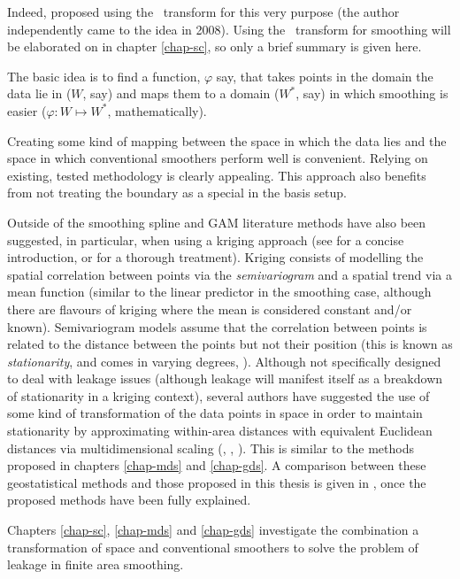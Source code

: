 \begin{enumerate}
Indeed,  proposed using the \sch\ transform for this very purpose (the author independently came to the idea in 2008). Using the \sch\ transform for smoothing will be elaborated on in chapter \ref{chap-sc}, so only a brief summary is given here.

The basic idea is to find a function, $\varphi$ say, that takes points in the domain the data lie in ($W$, say) and maps them to a domain ($W^*$, say) in which smoothing is easier ($\varphi : W \mapsto W^*$, mathematically).

Creating some kind of mapping between the space in which the data lies and the space in which conventional smoothers perform well is convenient. Relying on existing, tested methodology is clearly appealing. This approach also benefits from not treating the boundary as a special in the basis setup.
\end{enumerate}

Outside of the smoothing spline and GAM literature methods have also been suggested, in particular, when using a kriging approach (see \cite[pp. 425-430]{MASS} for a concise introduction, \cite{schabenberger} or \cite{diggle} for a thorough treatment). Kriging consists of modelling the spatial correlation between points via the \textit{semivariogram} and a spatial trend via a mean function (similar to the linear predictor in the smoothing case, although there are flavours of kriging where the mean is considered constant and/or known). Semivariogram models assume that the correlation between points is related to the distance between the points but not their position (this is known as \textit{stationarity}, and comes in varying degrees, \cite[pp. 42-44]{schabenberger}). Although not specifically designed to deal with leakage issues (although leakage will manifest itself as a breakdown of stationarity in a kriging context), several authors have suggested the use of some kind of transformation of the data points in space in order to maintain stationarity by approximating within-area distances with equivalent Euclidean distances  via multidimensional scaling (\cite{mdskrig}, \cite{crabkrig}, \cite{curriero}). This is similar to the methods proposed in chapters  \ref{chap-mds} and \ref{chap-gds}. A comparison between these geostatistical methods and those proposed in this thesis is given in , once the proposed methods have been fully explained.

Chapters \ref{chap-sc}, \ref{chap-mds} and \ref{chap-gds} investigate the combination a transformation of space and conventional smoothers to solve the problem of leakage in finite area smoothing.
